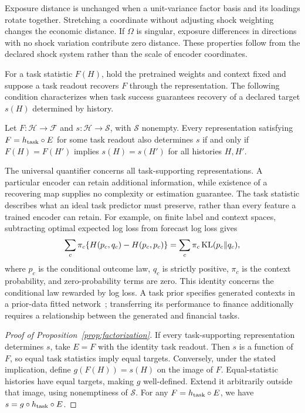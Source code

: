 \documentclass[11pt]{article}
\renewcommand{\lean}[1]{\ignorespaces}
\renewcommand{\leanok}{\ignorespaces}
\begin{document}
Exposure distance is unchanged when a unit-variance factor basis and its
loadings rotate together. Stretching a coordinate without adjusting shock
weighting changes the economic distance. If $\Omega$ is singular, exposure
differences in directions with no shock variation contribute zero distance.
These properties follow from the declared shock system rather than the scale
of encoder coordinates.

For a task statistic $F(H)$, hold the pretrained weights and context fixed and
suppose a task readout recovers $F$ through the representation. The following
condition characterizes when task success guarantees recovery of a declared
target $s(H)$ determined by history.
\begin{proposition}\label{prop:factorization}
  \lean{FreeFoundations.Alignment.optimal_imp_sufficient_iff}\leanok{}
  Let $F:\mathcal H\to\mathcal F$ and $s:\mathcal H\to\mathcal S$, with
  $\mathcal S$ nonempty. Every representation satisfying
  $F=h_{\rm task}\circ E$ for some task readout also determines $s$
  if and only if
  $F(H)=F(H')$ implies $s(H)=s(H')$ for all histories $H,H'$.
\end{proposition}
The universal quantifier concerns all task-supporting representations. A
particular encoder can retain additional information, while existence of a
recovering map supplies no complexity or estimation guarantee.
The task statistic describes what an ideal task predictor must preserve,
rather than every feature a trained encoder can retain. For example,
on finite label and context spaces, subtracting optimal
expected log loss from forecast log loss gives
\[
  \sum_c\pi_c\{H(p_c,q_c)-H(p_c,p_c)\}
  =\sum_c\pi_c\operatorname{KL}(p_c\Vert q_c),
\]
where $p_c$ is the conditional outcome law, $q_c$ is strictly positive,
$\pi_c$ is the context probability, and zero-probability terms are zero.
\lean{FreeFoundations.Score.pretraining_excess}\leanok{}
This identity concerns the conditional law rewarded by log loss. A task prior
specifies generated contexts in a prior-data fitted network~\cite{pfn,nagler};
transferring its performance to finance additionally requires a relationship
between the generated and financial tasks.

\begin{proof}[Proof of Proposition~\ref{prop:factorization}]
  If every task-supporting representation determines $s$, take $E=F$ with
  the identity task readout. Then $s$ is a function of $F$, so equal task
  statistics imply equal targets. Conversely, under the stated implication,
  define $g(F(H))=s(H)$ on the image of $F$. Equal-statistic histories have
  equal targets, making $g$ well-defined. Extend it arbitrarily outside that
  image, using nonemptiness of $\mathcal S$. For any
  $F=h_{\rm task}\circ E$, we have $s=g\circ h_{\rm task}\circ E$.
\end{proof}
\end{document}
